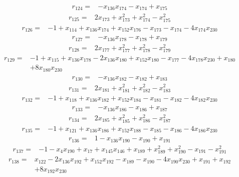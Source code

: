 \[\begin{aligned}
r_{124}={}&-x_{136}x_{174}-x_{174}+x_{175}
\end{aligned}\]
\[\begin{aligned}
r_{125}={}&2x_{173}+x_{173}^{2}+x_{174}^{2}-x_{175}^{2}
\end{aligned}\]
\[\begin{aligned}
r_{126}={}&-1+x_{114}+x_{136}x_{174}+x_{152}x_{176}-x_{173}-x_{174}-4x_{174}x_{230}
\end{aligned}\]
\[\begin{aligned}
r_{127}={}&-x_{136}x_{178}-x_{178}+x_{179}
\end{aligned}\]
\[\begin{aligned}
r_{128}={}&2x_{177}+x_{177}^{2}+x_{178}^{2}-x_{179}^{2}
\end{aligned}\]
\[\begin{aligned}
r_{129}={}&-1+x_{115}+x_{136}x_{178}-2x_{136}x_{180}+x_{152}x_{180}-x_{177}-4x_{178}x_{230}+x_{180}
\\ &+8x_{180}x_{230}
\end{aligned}\]
\[\begin{aligned}
r_{130}={}&-x_{136}x_{182}-x_{182}+x_{183}
\end{aligned}\]
\[\begin{aligned}
r_{131}={}&2x_{181}+x_{181}^{2}+x_{182}^{2}-x_{183}^{2}
\end{aligned}\]
\[\begin{aligned}
r_{132}={}&-1+x_{118}+x_{136}x_{182}+x_{152}x_{184}-x_{181}-x_{182}-4x_{182}x_{230}
\end{aligned}\]
\[\begin{aligned}
r_{133}={}&-x_{136}x_{186}-x_{186}+x_{187}
\end{aligned}\]
\[\begin{aligned}
r_{134}={}&2x_{185}+x_{185}^{2}+x_{186}^{2}-x_{187}^{2}
\end{aligned}\]
\[\begin{aligned}
r_{135}={}&-1+x_{121}+x_{136}x_{186}+x_{152}x_{188}-x_{185}-x_{186}-4x_{186}x_{230}
\end{aligned}\]
\[\begin{aligned}
r_{136}={}&1-x_{136}x_{190}-x_{190}+x_{191}
\end{aligned}\]
\[\begin{aligned}
r_{137}={}&-1-x_{4}x_{190}+x_{17}+x_{145}x_{146}+x_{189}+x_{189}^{2}+x_{190}^{2}-x_{191}-x_{191}^{2}
\end{aligned}\]
\[\begin{aligned}
r_{138}={}&x_{122}-2x_{136}x_{192}+x_{152}x_{192}-x_{189}-x_{190}-4x_{190}x_{230}+x_{191}+x_{192}
\\ &+8x_{192}x_{230}
\end{aligned}\]
